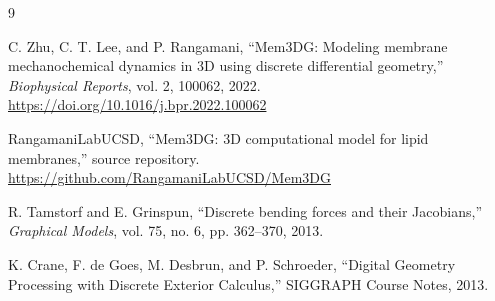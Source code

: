 \documentclass[11pt]{article}
\begin{document}
\begin{thebibliography}{9}

C. Zhu, C. T. Lee, and P. Rangamani,
``Mem3DG: Modeling membrane mechanochemical dynamics in 3D using discrete differential geometry,''
\emph{Biophysical Reports}, vol. 2, 100062, 2022.
\url{https://doi.org/10.1016/j.bpr.2022.100062}

RangamaniLabUCSD,
``Mem3DG: 3D computational model for lipid membranes,''
source repository.
\url{https://github.com/RangamaniLabUCSD/Mem3DG}

R. Tamstorf and E. Grinspun,
``Discrete bending forces and their Jacobians,''
\emph{Graphical Models}, vol. 75, no. 6, pp. 362--370, 2013.

K. Crane, F. de Goes, M. Desbrun, and P. Schroeder,
``Digital Geometry Processing with Discrete Exterior Calculus,''
SIGGRAPH Course Notes, 2013.

\end{thebibliography}
\end{document}
